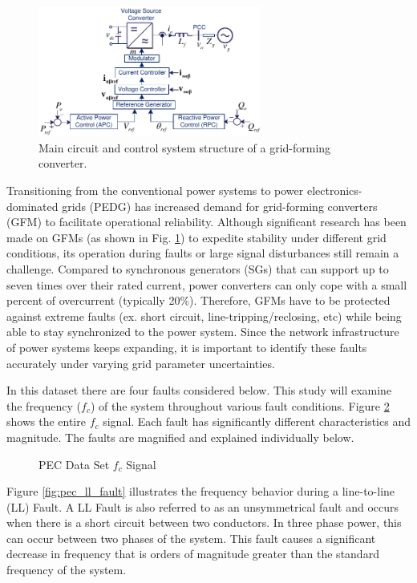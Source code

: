  \begin{figure}[H]
	\begin{center}
		\includegraphics[width=0.65\textwidth]{Images/GFMSchema.pdf}
	\end{center}
	\caption{Main circuit and control system structure of a grid-forming converter.}
	\label{fig:sys}
\end{figure}

Transitioning from the conventional power systems to power electronics-dominated grids (PEDG) has increased demand for grid-forming converters (GFM) to facilitate operational reliability. Although significant research has been made on GFMs (as shown in Fig. \ref{fig:sys}) to expedite stability under different grid conditions, its operation during faults or large signal disturbances still remain a challenge. Compared to synchronous generators (SGs) that can support up to seven times over their rated current, power converters can only cope with a small percent of overcurrent (typically 20\%). Therefore, GFMs have to be protected against extreme faults (ex. short circuit, line-tripping/reclosing, etc) while being able to stay synchronized to the power system. Since the network infrastructure of power systems keeps expanding, it is important to identify these faults accurately under varying grid parameter uncertainties.

In this dataset there are four faults considered below. This study will examine the frequency ($f_c$) of the system throughout various fault conditions. Figure \ref{fig:pec_all} shows the entire $f_c$ signal. Each fault has significantly different characteristics and magnitude. The faults are magnified and explained individually below.

\begin{figure}[H]
    \centering
    
    \caption{PEC Data Set $f_c$ Signal}
    \label{fig:pec_all}
\end{figure}

Figure \ref{fig:pec_ll_fault} illustrates the frequency behavior during a line-to-line (LL) Fault. A LL Fault is also referred to as an unsymmetrical fault and occurs when there is a short circuit between two conductors. In three phase power, this can occur between two phases of the system. This fault causes a significant decrease in frequency that is orders of magnitude greater than the standard frequency of the system. 

